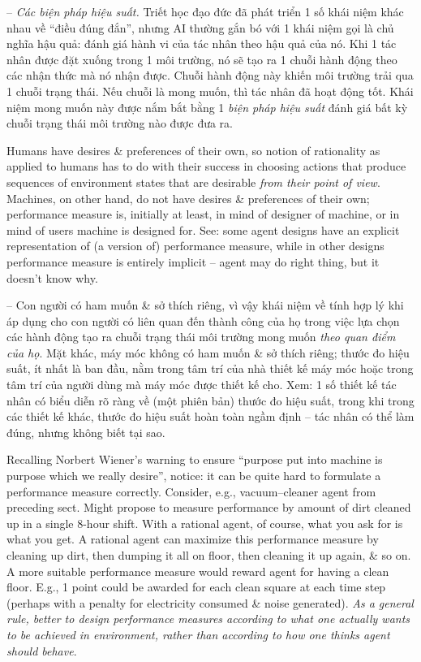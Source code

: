 \documentclass{article}
\begin{document}
\begin{itemize}
\begin{itemize}
\begin{itemize}
\begin{itemize}
				-- {\it Các biện pháp hiệu suất.} Triết học đạo đức đã phát triển 1 số khái niệm khác nhau về ``điều đúng đắn'', nhưng AI thường gắn bó với 1 khái niệm gọi là chủ nghĩa hậu quả: đánh giá hành vi của tác nhân theo hậu quả của nó. Khi 1 tác nhân được đặt xuống trong 1 môi trường, nó sẽ tạo ra 1 chuỗi hành động theo các nhận thức mà nó nhận được. Chuỗi hành động này khiến môi trường trải qua 1 chuỗi trạng thái. Nếu chuỗi là mong muốn, thì tác nhân đã hoạt động tốt. Khái niệm mong muốn này được nắm bắt bằng 1 {\it biện pháp hiệu suất} đánh giá bất kỳ chuỗi trạng thái môi trường nào được đưa ra.
				
				Humans have desires \& preferences of their own, so notion of rationality as applied to humans has to do with their success in choosing actions that produce sequences of environment states that are desirable {\it from their point of view}. Machines, on other hand, do not have desires \& preferences of their own; performance measure is, initially at least, in mind of designer of machine, or in mind of users machine is designed for. See: some agent designs have an explicit representation of (a version of) performance measure, while in other designs performance measure is entirely implicit -- agent may do right thing, but it doesn't know why.
				
				-- Con người có ham muốn \& sở thích riêng, vì vậy khái niệm về tính hợp lý khi áp dụng cho con người có liên quan đến thành công của họ trong việc lựa chọn các hành động tạo ra chuỗi trạng thái môi trường mong muốn {\it theo quan điểm của họ}. Mặt khác, máy móc không có ham muốn \& sở thích riêng; thước đo hiệu suất, ít nhất là ban đầu, nằm trong tâm trí của nhà thiết kế máy móc hoặc trong tâm trí của người dùng mà máy móc được thiết kế cho. Xem: 1 số thiết kế tác nhân có biểu diễn rõ ràng về (một phiên bản) thước đo hiệu suất, trong khi trong các thiết kế khác, thước đo hiệu suất hoàn toàn ngầm định -- tác nhân có thể làm đúng, nhưng không biết tại sao.
				
				Recalling {\sc Norbert Wiener}'s warning to ensure ``purpose put into machine is purpose which we really desire'', notice: it can be quite hard to formulate a performance measure correctly. Consider, e.g., vacuum--cleaner agent from preceding sect. Might propose to measure performance by amount of dirt cleaned up in a single 8-hour shift. With a rational agent, of course, what you ask for is what you get. A rational agent can maximize this performance measure by cleaning up dirt, then dumping it all on floor, then cleaning it up again, \& so on. A more suitable performance measure would reward agent for having a clean floor. E.g., 1 point could be awarded for each clean square at each time step (perhaps with a penalty for electricity consumed \& noise generated). {\it As a general rule, better to design performance measures according to what one actually wants to be achieved in environment, rather than according to how one thinks agent should behave}.
				

\end{itemize}
\end{itemize}
\end{itemize}
\end{itemize}
\end{document}
